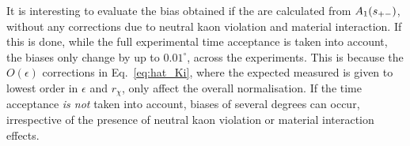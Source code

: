 It is interesting to evaluate the bias obtained if the \Ki are calculated from $A_1(s_{+-})$, without any corrections due to neutral kaon \CP violation and material interaction. If this is done, while the full experimental time acceptance is taken into account, the biases only change by up to $0.01^\circ$, across the experiments. This is because the $O(\epsilon)$ corrections in Eq.~\eqref{eq:hat_Ki}, where the expected measured \Ki is given to lowest order in $\epsilon$ and $r_\chi$, only affect the overall normalisation. If the time acceptance \emph{is not} taken into account, biases of several degrees can occur, irrespective of the presence of neutral kaon \CP violation or material interaction effects. 



